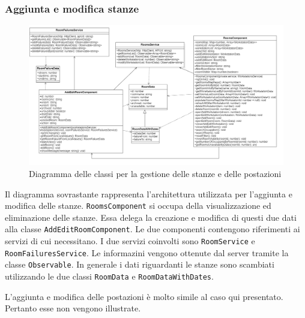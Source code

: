 \subsubsection{Aggiunta e modifica stanze}
\begin{figure}[H]
	\centering
	\includegraphics[width=18cm]{res/images/webapp-AddEditStanze-diagrammaClassi.png}
	\caption{Diagramma delle classi per la gestione delle stanze e delle postazioni}
	\label{fig:DiagrammaClassiStanzePostazioni}
\end{figure}
Il diagramma sovrastante rappresenta l'architettura utilizzata per l'aggiunta e modifica delle stanze. \newline
\texttt{RoomsComponent} si occupa della visualizzazione ed eliminazione delle stanze. Essa delega la creazione e modifica di questi due dati alla classe \texttt{AddEditRoomComponent}. Le due componenti contengono riferimenti ai servizi di cui necessitano. I due servizi coinvolti sono \texttt{RoomService} e \texttt{RoomFailuresService}. Le informazini vengono ottenute dal server tramite la classe \texttt{Observable}. In generale i dati riguardanti le stanze sono scambiati utilizzando le due classi \texttt{RoomData} e \texttt{RoomDataWithDates}.

L'aggiunta e modifica delle postazioni è molto simile al caso qui presentato. Pertanto esse non vengono illustrate.


